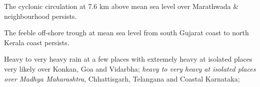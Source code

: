 \item The cyclonic circulation at 7.6 km above mean sea level over Marathwada \& neighbourhood 
persists.
\item The feeble off-shore trough at mean sea level from south Gujarat coast to north Kerala coast 
persists.
\item Heavy   to   very   heavy   rain   at   a   few   places   with   extremely   heavy   at 
isolated places very likely over Konkan, Goa and Vidarbha; \emph{heavy to very heavy at isolated 
places  over  Madhya   Maharashtra}, Chhattisgarh,   Telangana   and   Coastal   Karnataka; 